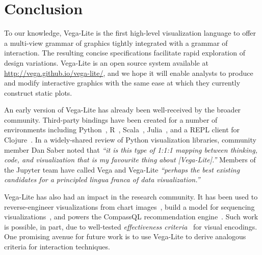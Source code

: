\section{Conclusion}
\label{sec:vl:conclusion}

To our knowledge, Vega-Lite is the first high-level visualization language to
offer a multi-view grammar of graphics tightly integrated with a grammar of
interaction. The resulting concise specifications facilitate rapid exploration
of design variations. Vega-Lite is an open source system available at
\url{http://vega.github.io/vega-lite/}, and we hope it will enable analysts to
produce and modify interactive graphics with the same ease at which they
currently construct static plots.

An early version of Vega-Lite has already been well-received by the broader
community. Third-party bindings have been created for a number of environments
including Python~\cite{vega-lite:altair}, R~\cite{vega-lite:hrbrmstr,
vega-lite:timelyportfolio}, Scala~\cite{vega-lite:scala},
Julia~\cite{vega-lite:julia}, and a REPL client for
Clojure~\cite{vega-lite:clojure}. In a widely-shared review of Python
visualization libraries, community member Dan Saber noted that \emph{``it is
this type of 1:1:1 mapping between thinking, code, and visualization that is my
favourite thing about [Vega-Lite].''} Members of the Jupyter team have called
Vega and Vega-Lite \emph{``perhaps the best existing candidates for a principled
\emph{lingua franca} of data visualization.''}

Vega-Lite has also had an impact in the research community. It has been used to
reverse-engineer visualizations from chart images~\cite{poco:reverse}, build a
model for sequencing visualizations~\cite{kim:graphscape}, and powers the
CompassQL recommendation engine~\cite{voyager, compassql}. Such work is
possible, in part, due to well-tested \emph{effectiveness
criteria}~\cite{bertin:semiology, cleveland:perception, mackinlay:apt} for
visual encodings. One promising avenue for future work is to use Vega-Lite to
derive analogous criteria for interaction techniques.